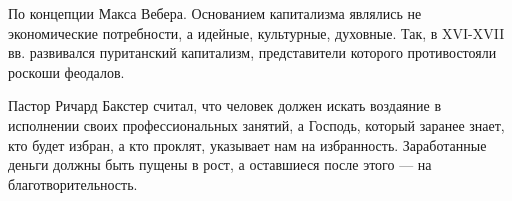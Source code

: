 По концепции Макса Вебера. Основанием капитализма являлись не экономические потребности, а идейные, культурные, духовные. Так, в XVI-XVII вв. развивался пуританский капитализм, представители которого противостояли роскоши феодалов.


Пастор Ричард Бакстер считал, что человек должен искать воздаяние в исполнении своих профессиональных занятий, а Господь, который заранее знает, кто будет избран, а кто проклят, указывает нам на избранность. Заработанные деньги должны быть пущены в рост, а оставшиеся после этого --- на благотворительность.





